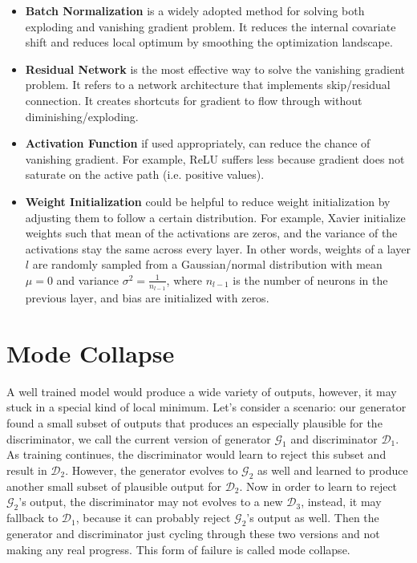 \begin{itemize}
    \item \textbf{Batch Normalization} is a widely adopted method for solving both exploding and vanishing gradient problem. It reduces the internal covariate shift\cite{ioffeBatchNormalizationAccelerating2015a} and reduces local optimum by smoothing the optimization landscape\cite{santurkarHowDoesBatch2018}.
    \item \textbf{Residual Network} is the most effective way to solve the vanishing gradient problem. It refers to a network architecture that implements skip/residual connection. It creates shortcuts for gradient to flow through without diminishing/exploding.
    \item \textbf{Activation Function} if used appropriately, can reduce the chance of vanishing gradient. For example, ReLU suffers less because gradient does not saturate on the active path (i.e. positive values)\cite{glorotDeepSparseRectifier2011}.
    \item \textbf{Weight Initialization}\label{app:ml:van_grad:weight_init} could be helpful to reduce weight initialization by adjusting them to follow a certain distribution. For example, Xavier\cite{glorotUnderstandingDifficultyTraining2010} initialize weights such that mean of the activations are zeros, and the variance of the activations stay the same across every layer. In other words, weights of a layer $l$ are randomly sampled from a Gaussian/normal distribution with mean $\mu = 0$ and variance $\sigma^2=\frac{1}{n_{l-1}}$, where $n_{l-1}$ is the number of neurons in the previous layer, and bias are initialized with zeros.
\end{itemize}

\section{Mode Collapse}
\label{app:ml:mode_col}
A well trained model would produce a wide variety of outputs, however, it may stuck in a special kind of local minimum. Let's consider a scenario: our generator found a small subset of outputs that produces an especially plausible for the discriminator, we call the current version of generator $\mathcal{G}_1$ and discriminator $\mathcal{D}_1$. As training continues, the discriminator would learn to reject this subset and result in $\mathcal{D}_2$.  However, the generator evolves to $\mathcal{G}_2$ as well and learned to produce another small subset of plausible output for $\mathcal{D}_2$. Now in order to learn to reject $\mathcal{G}_2$'s output, the discriminator may not evolves to a new $\mathcal{D}_3$, instead, it may fallback to $\mathcal{D}_1$, because it can probably reject $\mathcal{G}_2$'s output as well. Then the generator and discriminator just cycling through these two versions and not making any real progress. This form of failure is called mode collapse.

